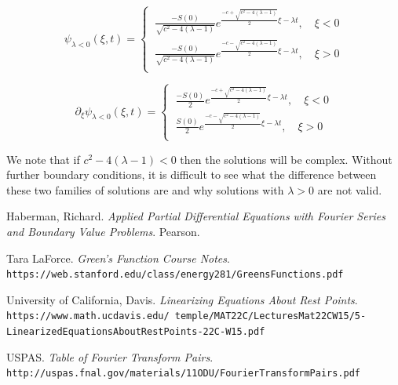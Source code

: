 \documentclass[12pt]{article}
\begin{document}
\begin{equation}\label{solnlambda-}
\psi_{\lambda <0}(\xi,t)=
\begin{cases}
\ \frac{-S(0)}{\sqrt{c^2-4(\lambda-1)}}e^{\frac{-c+\sqrt{c^2-4(\lambda-1)}}{2}\xi -\lambda t},\quad \xi < 0 \\
\ \frac{-S(0)}{\sqrt{c^2-4(\lambda-1)}}e^{\frac{-c-\sqrt{c^2-4(\lambda-1)}}{2}\xi-\lambda t},\quad \xi > 0\\
\end{cases}
\end{equation}

\begin{equation}\label{solndevlambda-}
\partial_{\xi}\psi_{\lambda <0}(\xi,t)=
\begin{cases}
\ \frac{-S(0)}{2}e^{\frac{-c+\sqrt{c^2-4(\lambda-1)}}{2}\xi -\lambda t},\quad \xi < 0 \\
\ \frac{S(0)}{2}e^{\frac{-c-\sqrt{c^2-4(\lambda-1)}}{2}\xi-\lambda t},\quad \xi > 0\\
\end{cases}
\end{equation}

We note that if $c^2-4(\lambda-1) < 0$  then the solutions will be complex. Without further boundary conditions, it is difficult to see what the difference between these two families of solutions are and why solutions with $\lambda > 0$ are not valid. 

\pagebreak

\begin{thebibliography}{9}

Haberman, Richard.
\textit{Applied Partial Differential Equations with Fourier Series and Boundary Value Problems}.
Pearson.

Tara LaForce.
\textit{Green's Function Course Notes}. \\
\texttt{https://web.stanford.edu/class/energy281/GreensFunctions.pdf}

University of California, Davis.
\textit{Linearizing Equations About Rest Points}. \\
\texttt{https://www.math.ucdavis.edu/~temple/MAT22C/LecturesMat22CW15/5-\\LinearizedEquationsAboutRestPoints-22C-W15.pdf}

USPAS.
\textit{Table of Fourier Transform Pairs}. \\\texttt{http://uspas.fnal.gov/materials/11ODU/FourierTransformPairs.pdf}

\end{thebibliography}
\end{document}
